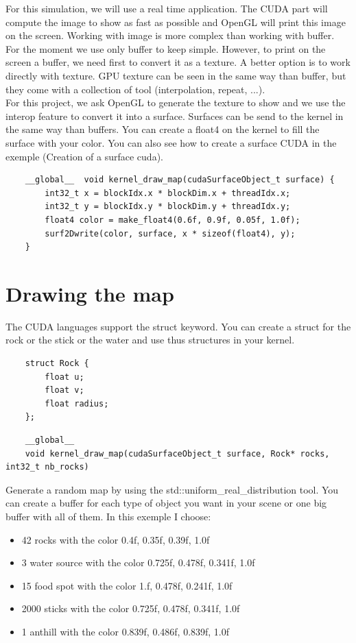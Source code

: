 \documentclass{article}
\begin{document}
For this simulation, we will use a real time application. The CUDA part will compute the image to show as fast as possible and OpenGL will print this image on the screen. Working with image is more complex than working with buffer. For the moment we use only buffer to keep simple. However, to print on the screen a buffer, we need first to convert it as a texture. A better option is to work directly with texture. GPU texture can be seen in the same way than buffer, but they come with a collection of tool (interpolation, repeat, ...).\\
For this project, we ask OpenGL to generate the texture to show and we use the interop feature to convert it into a surface. Surfaces can be send to the kernel in the same way than buffers. You can create a float4 on the kernel to fill the surface with your color. You can also see how to create a surface CUDA in the exemple (Creation of a surface cuda).
\begin{lstlisting}
	__global__  void kernel_draw_map(cudaSurfaceObject_t surface) {
		int32_t x = blockIdx.x * blockDim.x + threadIdx.x;
		int32_t y = blockIdx.y * blockDim.y + threadIdx.y;
		float4 color = make_float4(0.6f, 0.9f, 0.05f, 1.0f);
		surf2Dwrite(color, surface, x * sizeof(float4), y);
	}
\end{lstlisting}

\section{Drawing the map}
The CUDA languages support the struct keyword. You can create a struct for the rock or the stick or the water and use thus structures in your kernel.
\begin{lstlisting}
	struct Rock {
		float u;
		float v;
		float radius;
	};
\end{lstlisting}
\begin{lstlisting}
	__global__ 
	void kernel_draw_map(cudaSurfaceObject_t surface, Rock* rocks, int32_t nb_rocks)
\end{lstlisting}
Generate a random map by using the std::uniform\_real\_distribution tool. You can create a buffer for each type of object you want in your scene or one big buffer with all of them. In this exemple I choose:
\begin{itemize}
	\item 42 rocks with the color 0.4f, 0.35f, 0.39f, 1.0f
\item 3 water source with the color 0.725f, 0.478f, 0.341f, 1.0f
\item 15 food spot with the color 1.f, 0.478f, 0.241f, 1.0f
\item 2000 sticks with the color 0.725f, 0.478f, 0.341f, 1.0f
\item 1 anthill with the color 0.839f, 0.486f, 0.839f, 1.0f
\end{itemize}
\end{document}

